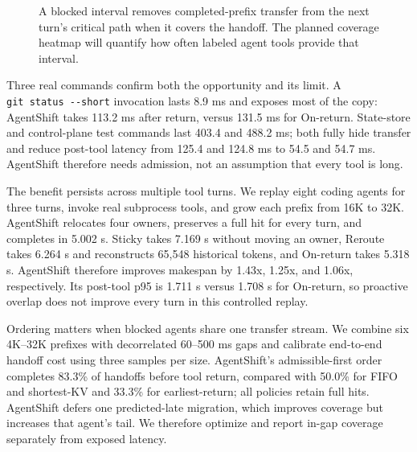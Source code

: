 \begin{figure}[t]
  \centering
  \caption{A blocked interval removes completed-prefix transfer from the next turn's critical path when it covers the handoff. The planned coverage heatmap will quantify how often labeled agent tools provide that interval.}
  \label{fig:gap}
\end{figure}

Three real commands confirm both the opportunity and its limit. A \texttt{git\ status\ -\/-short} invocation lasts 8.9 ms and exposes most of the copy: AgentShift takes 113.2 ms after return, versus 131.5 ms for On-return. State-store and control-plane test commands last 403.4 and 488.2 ms; both fully hide transfer and reduce post-tool latency from 125.4 and 124.8 ms to 54.5 and 54.7 ms. AgentShift therefore needs admission, not an assumption that every tool is long.

The benefit persists across multiple tool turns. We replay eight coding agents for three turns, invoke real subprocess tools, and grow each prefix from 16K to 32K. AgentShift relocates four owners, preserves a full hit for every turn, and completes in 5.002 s. Sticky takes 7.169 s without moving an owner, Reroute takes 6.264 s and reconstructs 65,548 historical tokens, and On-return takes 5.318 s. AgentShift therefore improves makespan by 1.43x, 1.25x, and 1.06x, respectively. Its post-tool p95 is 1.711 s versus 1.708 s for On-return, so proactive overlap does not improve every turn in this controlled replay.

Ordering matters when blocked agents share one transfer stream. We combine six 4K--32K prefixes with decorrelated 60--500 ms gaps and calibrate end-to-end handoff cost using three samples per size. AgentShift's admissible-first order completes 83.3\% of handoffs before tool return, compared with 50.0\% for FIFO and shortest-KV and 33.3\% for earliest-return; all policies retain full hits. AgentShift defers one predicted-late migration, which improves coverage but increases that agent's tail. We therefore optimize and report in-gap coverage separately from exposed latency.

